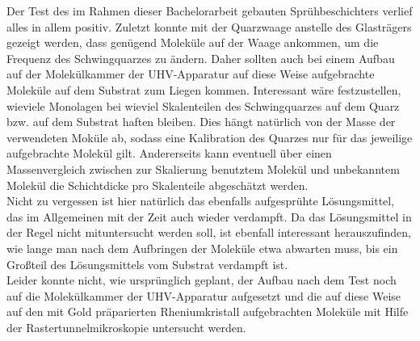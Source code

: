% 
% 
% 
% 
% 



Der Test des im Rahmen dieser Bachelorarbeit gebauten Sprühbeschichters verlief alles in allem
positiv. Zuletzt konnte mit der Quarzwaage anstelle des Glasträgers gezeigt werden, dass genügend
Moleküle auf der Waage ankommen, um die Frequenz des Schwingquarzes zu ändern. Daher sollten auch
bei einem Aufbau auf der Molekülkammer der UHV-Apparatur auf diese Weise aufgebrachte Moleküle auf
dem Substrat zum Liegen kommen. Interessant wäre festzustellen, wieviele Monolagen bei wieviel
Skalenteilen des Schwingquarzes auf dem Quarz bzw. auf dem Substrat haften bleiben. Dies hängt
natürlich von der Masse der verwendeten Moküle ab, sodass eine Kalibration des Quarzes nur für das
jeweilige aufgebrachte Molekül gilt. Andererseits kann eventuell über einen Massenvergleich zwischen
zur Skalierung benutztem Molekül und unbekanntem Molekül die Schichtdicke pro Skalenteile
abgeschätzt werden.\\
Nicht zu vergessen ist hier natürlich das ebenfalls aufgesprühte Lösungsmittel, das im
Allgemeinen mit der Zeit auch wieder verdampft. Da das Lösungsmittel in der Regel nicht
mituntersucht werden soll, ist ebenfall interessant herauszufinden, wie lange man nach dem
Aufbringen der Moleküle etwa abwarten muss, bis ein Großteil des Lösungsmittels vom Substrat
verdampft ist.\\

Leider konnte nicht, wie ursprünglich geplant, der Aufbau nach dem Test noch auf die Molekülkammer
der UHV-Apparatur aufgesetzt und die auf diese Weise auf den mit Gold präparierten Rheniumkristall
aufgebrachten Moleküle mit Hilfe der Rastertunnelmikroskopie untersucht werden.
